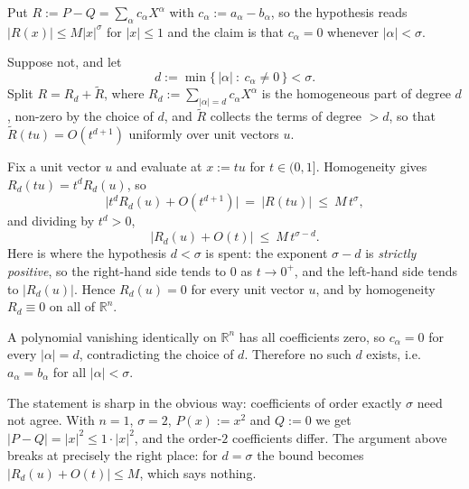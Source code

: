 \begin{exercisesolution}
\label{sol:polynomials_multivariate_expansion}
Put $R := P - Q = \sum_\alpha c_\alpha X^\alpha$ with $c_\alpha := a_\alpha - b_\alpha$, so the
hypothesis reads $|R(x)| \leq M|x|^\sigma$ for $|x| \leq 1$ and the claim is that
$c_\alpha = 0$ whenever $|\alpha| < \sigma$.

Suppose not, and let
\[d := \min\{\,|\alpha| \ :\ c_\alpha \neq 0\,\} < \sigma.\]
Split $R = R_d + \widetilde R$, where $R_d := \sum_{|\alpha| = d}c_\alpha X^\alpha$ is the
homogeneous part of degree $d$, non-zero by the choice of $d$, and $\widetilde R$ collects
the terms of degree $> d$, so that $\widetilde R(tu) = O(t^{d+1})$ uniformly over unit vectors
$u$.

Fix a unit vector $u$ and evaluate at $x := tu$ for $t \in (0,1]$. Homogeneity gives
$R_d(tu) = t^dR_d(u)$, so
\[\big|t^dR_d(u) + O(t^{d+1})\big| \ =\ |R(tu)| \ \leq\ M\,t^{\sigma},\]
and dividing by $t^d > 0$,
\[\big|R_d(u) + O(t)\big| \ \leq\ M\,t^{\sigma - d}.\]
Here is where the hypothesis $d < \sigma$ is spent: the exponent $\sigma - d$ is \emph{strictly
positive}, so the right-hand side tends to $0$ as $t \to 0^+$, and the left-hand side tends to
$|R_d(u)|$. Hence $R_d(u) = 0$ for every unit vector $u$, and by homogeneity $R_d \equiv 0$ on
all of $\mathbb{R}^n$.

A polynomial vanishing identically on $\mathbb{R}^n$ has all coefficients zero, so $c_\alpha = 0$
for every $|\alpha| = d$, contradicting the choice of $d$. Therefore no such $d$ exists, i.e.\
$a_\alpha = b_\alpha$ for all $|\alpha| < \sigma$.

\begin{ainote}
The statement is sharp in the obvious way: coefficients of order exactly $\sigma$ need not agree.
With $n=1$, $\sigma = 2$, $P(x) := x^2$ and $Q := 0$ we get $|P-Q| = |x|^2 \leq 1\cdot|x|^2$, and
the order-$2$ coefficients differ. The argument above breaks at precisely the right place: for
$d = \sigma$ the bound becomes $|R_d(u) + O(t)| \leq M$, which says nothing.
\end{ainote}
\end{exercisesolution}

